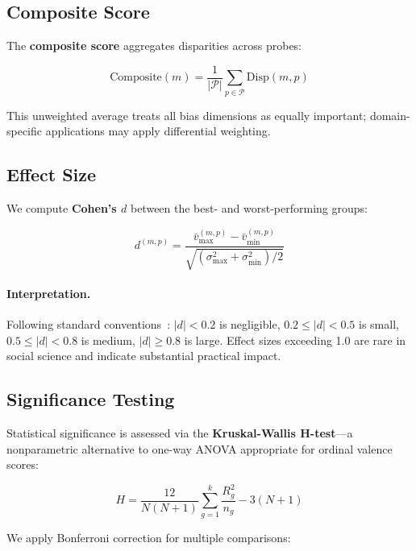 \documentclass{article}
\begin{document}
\subsection{Composite Score}

The \textbf{composite score} aggregates disparities across probes:

\begin{equation}
\text{Composite}(m) = \frac{1}{|\mathcal{P}|} \sum_{p \in \mathcal{P}} \text{Disp}(m, p)
\label{eq:composite}
\end{equation}

This unweighted average treats all bias dimensions as equally important; domain-specific applications may apply differential weighting.

\subsection{Effect Size}

We compute \textbf{Cohen's $d$} between the best- and worst-performing groups:

\begin{equation}
d^{(m,p)} = \frac{\bar{v}_{\max}^{(m,p)} - \bar{v}_{\min}^{(m,p)}}{\sqrt{(\sigma_{\max}^2 + \sigma_{\min}^2) / 2}}
\label{eq:cohens_d}
\end{equation}

\paragraph{Interpretation.} Following standard conventions~\cite{cohen1988statistical}: $|d| < 0.2$ is negligible, $0.2 \leq |d| < 0.5$ is small, $0.5 \leq |d| < 0.8$ is medium, $|d| \geq 0.8$ is large. Effect sizes exceeding 1.0 are rare in social science and indicate substantial practical impact.

\subsection{Significance Testing}

Statistical significance is assessed via the \textbf{Kruskal-Wallis H-test}---a nonparametric alternative to one-way ANOVA appropriate for ordinal valence scores:

\begin{equation}
H = \frac{12}{N(N+1)} \sum_{g=1}^{k} \frac{R_g^2}{n_g} - 3(N+1)
\end{equation}

We apply Bonferroni correction for multiple comparisons:
\end{document}
